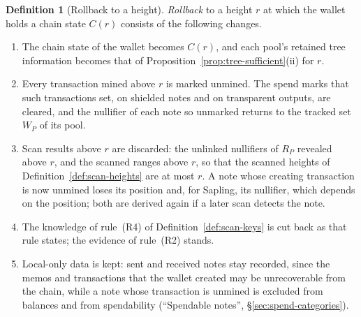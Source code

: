 \documentclass[11pt,a4paper]{article}
\theoremstyle{definition}
\newtheorem{definition}[theorem]{Definition}
\begin{document}
\begin{definition}[Rollback to a height]\label{def:tree-rollback}
\emph{Rollback} to a height $r$ at which the wallet holds a chain state
$C(r)$ consists of the following changes.
\begin{enumerate}[label=(\roman*)]
\item The chain state of the wallet becomes $C(r)$, and each pool's
  retained tree information becomes that of
  Proposition~\ref{prop:tree-sufficient}(ii) for $r$.
\item Every transaction mined above $r$ is marked unmined. The spend marks
  that such transactions set, on shielded notes and on transparent
  outputs, are cleared, and the nullifier of each note so unmarked returns
  to the tracked set $W_P$ of its pool.
\item Scan results above $r$ are discarded: the unlinked nullifiers of
  $R_P$ revealed above $r$, and the scanned ranges above $r$, so that the
  scanned heights of Definition~\ref{def:scan-heights} are at most $r$. A
  note whose creating transaction is now unmined loses its position and,
  for Sapling, its nullifier, which depends on the position; both are
  derived again if a later scan detects the note.
\item The knowledge of rule~(R4) of Definition~\ref{def:scan-keys} is cut
  back as that rule states; the evidence of rule~(R2) stands.
\item Local-only data is kept: sent and received notes stay recorded, since
  the memos and transactions that the wallet created may be unrecoverable
  from the chain, while a note whose transaction is unmined is excluded from
  balances and from spendability (``Spendable notes'',
  \S\ref{sec:spend-categories}).
\end{enumerate}
\end{definition}
\end{document}
